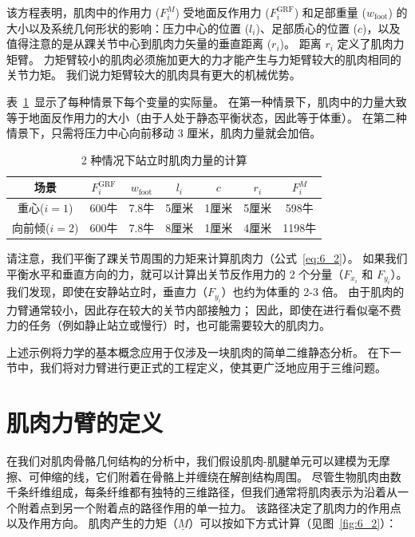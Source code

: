 该方程表明，肌肉中的作用力 ($F_i^M$) 受地面反作用力 ($F_i ^{\text{GRF}}$) 和足部重量 ($w_\text{foot}$) 的大小以及系统几何形状的影响：压力中心的位置 ($l_i$)、足部质心的位置 ($c$)，以及值得注意的是从踝关节中心到肌肉力矢量的垂直距离 ($r_i$)。
距离 $r_i$ 定义了肌肉力矩臂。
力矩臂较小的肌肉必须施加更大的力才能产生与力矩臂较大的肌肉相同的关节力矩。
我们说力矩臂较大的肌肉具有更大的机械优势。


表~\ref{tab:6_1}~显示了每种情景下每个变量的实际量。
在第一种情景下，肌肉中的力量大致等于地面反作用力的大小（由于人处于静态平衡状态，因此等于体重）。
在第二种情景下，只需将压力中心向前移动 3 厘米，肌肉力量就会加倍。


\begin{table}[htbp]
	\caption{2 种情况下站立时肌肉力量的计算} \label{tab:6_1} \centering
	\begin{tabular}{ccccccc} %
		\toprule
		场景 & $F_i^{\text{GRF}}$ & $w_\text{foot}$ & $l_i$ & $c$ & $r_i$ & $F_i^M$ \\
		\midrule
		重心($i=1$) & 600牛 &  7.8牛 & 5厘米 & 1厘米 & 5厘米 & 598牛 \\
		\midrule
		向前倾($i=2$) & 600牛 &  7.8牛 & 8厘米 & 1厘米 & 4厘米 & 1198牛 \\
		\bottomrule
	\end{tabular}
\end{table}


请注意，我们平衡了踝关节周围的力矩来计算肌肉力（公式~\ref{eq:6_2}）。
如果我们平衡水平和垂直方向的力，就可以计算出关节反作用力的 2 个分量（$F_{x_i}$ 和 $F_{y_i}$）。
我们发现，即使在安静站立时，垂直力（$F_{y_i}$）也约为体重的 2-3 倍。
由于肌肉的力臂通常较小，因此存在较大的关节内部接触力；
因此，即使在进行看似毫不费力的任务（例如静止站立或慢行）时，也可能需要较大的肌肉力。


上述示例将力学的基本概念应用于仅涉及一块肌肉的简单二维静态分析。
在下一节中，我们将对力臂进行更正式的工程定义，使其更广泛地应用于三维问题。



\section{肌肉力臂的定义}

在我们对肌肉骨骼几何结构的分析中，我们假设肌肉-肌腱单元可以建模为无摩擦、可伸缩的线，它们附着在骨骼上并缠绕在解剖结构周围。
尽管生物肌肉由数千条纤维组成，每条纤维都有独特的三维路径，但我们通常将肌肉表示为沿着从一个附着点到另一个附着点的路径作用的单一拉力。
该路径决定了肌肉力的作用点以及作用方向。
肌肉产生的力矩（$ \underline{M} $）可以按如下方式计算（见图~\ref{fig:6_2}）：


